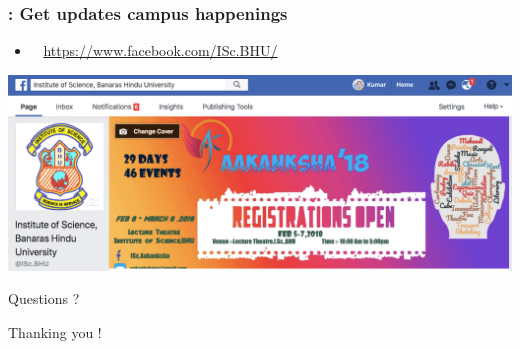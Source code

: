 \documentclass[]{beamer} %
\begin{document}
\begin{frame}%
 \frametitle{\faFacebookSquare: Get updates campus happenings} 
 	\begin{itemize}	
	\item<+-> \faFacebook ~ \url{https://www.facebook.com/ISc.BHU/} 
	\end{itemize}
	\visible<+->
		{%
		\centering
		\includegraphics[width=.75\textwidth]{Resources/fb.png} \\ %
		}
\end{frame}


\begin{frame}[plain]
 	\begin{center}
 	{\Large \color{red} Questions ?} \\
	
	\medskip
	
	{\Large \color{blue} Thanking you ! }
	\end{center}
\end{frame}

\end{document}
